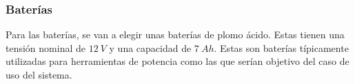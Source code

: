 \subsubsection{Baterías}

Para las baterías, se van a elegir unas baterías de plomo ácido. Estas tienen una tensión nominal de $12\ V$ y una capacidad de $7\ Ah$. Estas son baterías típicamente utilizadas para herramientas de potencia como las que serían objetivo del caso de uso del sistema.